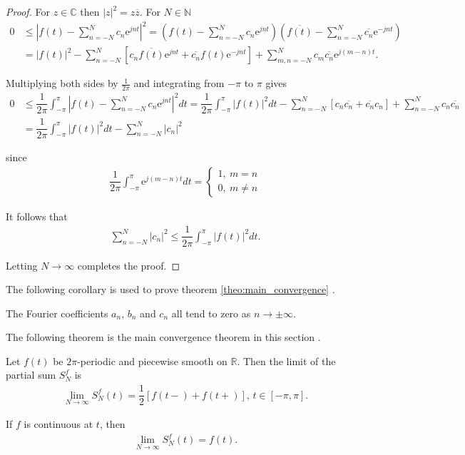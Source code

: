 \begin{proof}
For $z \in \mathbb{C}$ then $|z|^2 = z \overline{z}$. For $N \in \mathbb{N}$
\begin{align*}
0 &\leq \left| f(t) - \sum_{n=-N}^N c_n \text{e}^{jnt} \right|^2 = \left( f(t) - \sum_{n=-N}^N c_n \text{e}^{jnt} \right) \left( \overline{f(t)} - \sum_{n=-N}^N \overline{c_n} \text{e}^{-jnt} \right) \\
&= |f(t)|^2 - \sum_{n=-N}^N \left[ c_n \overline{f(t)} \text{e}^{jnt} + \overline{c_n} f(t) \text{e}^{-jnt} \right] + \sum_{m,n=-N}^N c_m\overline{c_n} \text{e}^{j(m-n)t}.
\end{align*}

Multiplying both sides by $\frac{1}{2\pi}$ and integrating from $-\pi$ to $\pi$ gives
\begin{align*}
0 &\leq \dfrac{1}{2\pi} \int_{-\pi}^\pi \left| f(t) - \sum_{n=-N}^N c_n \text{e}^{jnt} \right|^2 dt = \dfrac{1}{2\pi} \int_{-\pi}^\pi |f(t)|^2 dt - \sum_{n=-N}^N \left[ c_n \overline{c_n} + \overline{c_n} c_n \right] + \sum_{n=-N}^N c_n \overline{c_n} \\
&= \dfrac{1}{2\pi} \int_{-\pi}^\pi |f(t)|^2 dt - \sum_{n=-N}^N |c_n|^2
\end{align*}

since
\begin{align*}
\dfrac{1}{2\pi} \int_{-\pi}^\pi \text{e}^{j(m-n)t} dt =
\begin{cases}
1, \ m = n \\
0, \ m \neq n
\end{cases}
\end{align*}

It follows that
\begin{align*}
\sum_{n=-N}^N |c_n|^2 \leq \dfrac{1}{2\pi} \int_{-\pi}^\pi |f(t)|^2 dt.
\end{align*}

Letting $N\to\infty$ completes the proof.
\end{proof}

The following corollary is used to prove theorem \ref{theo:main_convergence} \cite{page 31, FAA}.

\begin{corollary} \label{coro:conv_Fourier_coeff}
The Fourier coefficients $a_n$, $b_n$ and $c_n$ all tend to zero as $n \to \pm \infty$.
\end{corollary}

The following theorem is the main convergence theorem in this section \cite{page 35, FAA}.

\begin{theorem} \label{theo:main_convergence}
Let $f(t)$ be $2\pi$-periodic and piecewise smooth on $\mathbb{R}$. Then the limit of the partial sum $S_N^f$ is
	\begin{align*}
		\lim_{N\to\infty} S_N^f (t) = \dfrac{1}{2}\left[f(t-) + 		f(t+)\right], \, t \in [-\pi, \pi].
	\end{align*}

If $f$ is continuous at $t$, then
	\begin{align*}
		\lim_{N\to \infty} S_N^f(t) = f(t).
	\end{align*}
\end{theorem}

